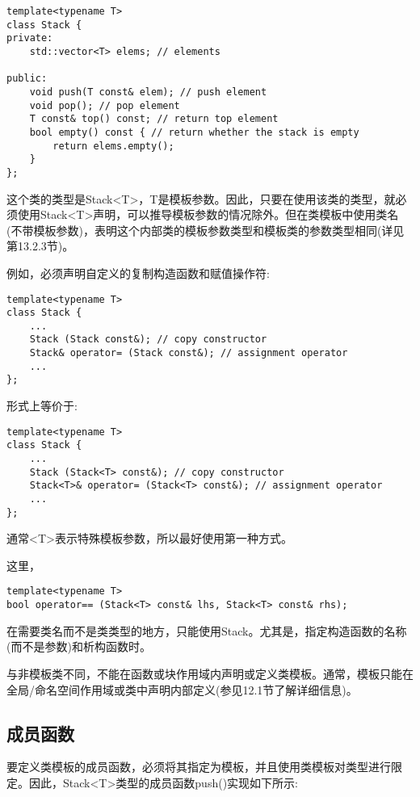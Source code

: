 \begin{lstlisting}[style=styleCXX]
template<typename T>
class Stack {
private:
	std::vector<T> elems; // elements
	
public:
	void push(T const& elem); // push element
	void pop(); // pop element
	T const& top() const; // return top element
	bool empty() const { // return whether the stack is empty
		return elems.empty();
	}
};
\end{lstlisting}

这个类的类型是Stack<T>，T是模板参数。因此，只要在使用该类的类型，就必须使用Stack<T>声明，可以推导模板参数的情况除外。但在类模板中使用类名(不带模板参数)，表明这个内部类的模板参数类型和模板类的参数类型相同(详见第13.2.3节)。

例如，必须声明自定义的复制构造函数和赋值操作符:

\begin{lstlisting}[style=styleCXX]
template<typename T>
class Stack {
	...
	Stack (Stack const&); // copy constructor
	Stack& operator= (Stack const&); // assignment operator
	...
};
\end{lstlisting}

形式上等价于:

\begin{lstlisting}[style=styleCXX]
template<typename T>
class Stack {
	...
	Stack (Stack<T> const&); // copy constructor
	Stack<T>& operator= (Stack<T> const&); // assignment operator
	...
};
\end{lstlisting}

通常<T>表示特殊模板参数，所以最好使用第一种方式。

这里，

\begin{lstlisting}[style=styleCXX]
template<typename T>
bool operator== (Stack<T> const& lhs, Stack<T> const& rhs);
\end{lstlisting}

在需要类名而不是类类型的地方，只能使用Stack。尤其是，指定构造函数的名称(而不是参数)和析构函数时。

与非模板类不同，不能在函数或块作用域内声明或定义类模板。通常，模板只能在全局/命名空间作用域或类中声明内部定义(参见12.1节了解详细信息)。

\subsection{成员函数}

要定义类模板的成员函数，必须将其指定为模板，并且使用类模板对类型进行限定。因此，Stack<T>类型的成员函数push()实现如下所示:

